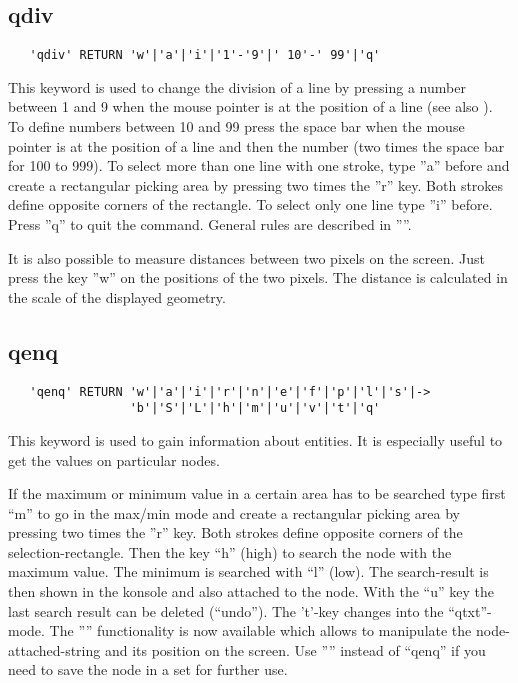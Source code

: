 \documentclass{article}
\begin{document}
\subsection{\label{qdiv}qdiv}
\begin{verbatim}
   'qdiv' RETURN 'w'|'a'|'i'|'1'-'9'|' 10'-' 99'|'q' 
\end{verbatim}
This keyword is used to change the division of a line by pressing a number between 1 and 9 when the mouse pointer is at the position of a line (see also ). To define numbers between 10 and 99 press the space bar when the mouse pointer is at the position of a line and then the number (two times the space bar for 100 to 999). To select more than one line with one stroke, type ''a'' before and create a rectangular picking area by pressing two times the ''r'' key. Both strokes define opposite corners of the rectangle. To select only one line type ''i'' before. Press ''q'' to quit the command. General rules are described in ''''. 

It is also possible to measure distances between two pixels on the screen. Just press the key ''w'' on the positions of the two pixels. The distance is calculated in the scale of the displayed geometry.

\subsection{\label{qenq}qenq}
\begin{verbatim}
   'qenq' RETURN 'w'|'a'|'i'|'r'|'n'|'e'|'f'|'p'|'l'|'s'|->
                 'b'|'S'|'L'|'h'|'m'|'u'|'v'|'t'|'q' 
\end{verbatim}
This keyword is used to gain information about entities. It is especially useful to get the values on particular nodes.

If the maximum or minimum value in a certain area has to be searched type first ``m'' to go in the max/min mode and create a rectangular picking area by pressing two times the ''r'' key. Both strokes define opposite corners of the selection-rectangle. Then the key ``h'' (high) to search the node with the maximum value. The minimum is searched with ``l'' (low). The search-result is then shown in the konsole and also attached to the node. With the ``u'' key the last search result can be deleted (``undo''). The 't'-key changes into the ``qtxt''-mode. The '''' functionality is now available which allows to manipulate the node-attached-string and its position on the screen. Use '''' instead of ``qenq'' if you need to save the node in a set for further use.
\end{document}
